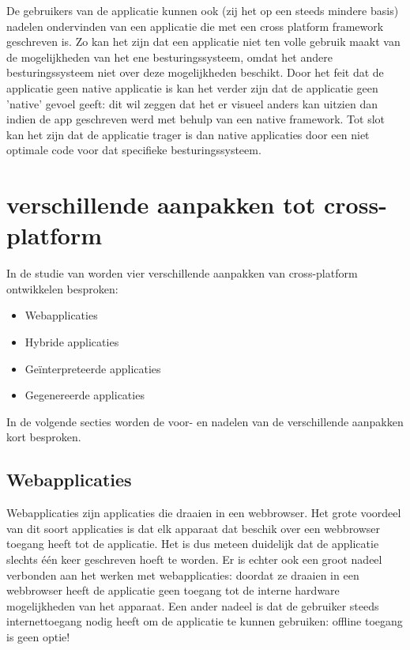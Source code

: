 De gebruikers van de applicatie kunnen ook (zij het op een steeds mindere basis) nadelen ondervinden van een applicatie die met een cross platform framework geschreven is. Zo kan het zijn dat een applicatie niet ten volle gebruik maakt van de mogelijkheden van het ene besturingssysteem, omdat het andere besturingssysteem niet over deze mogelijkheden beschikt. Door het feit dat de applicatie geen native applicatie is kan het verder zijn dat de applicatie geen 'native' gevoel geeft: dit wil zeggen dat het er visueel anders kan uitzien dan indien de app geschreven werd met behulp van een native framework. Tot slot kan het zijn dat de applicatie trager is dan native applicaties door een niet optimale code voor dat specifieke besturingssysteem.

\section{verschillende aanpakken tot cross-platform}
 
 In de studie van \textcite{Xanthopoulos2013} worden vier verschillende aanpakken van cross-platform ontwikkelen besproken:
 
 \begin{itemize}
     \item Webapplicaties
     \item Hybride applicaties
     \item Geïnterpreteerde applicaties
     \item Gegenereerde applicaties
 \end{itemize}

In de volgende secties worden de voor- en nadelen van de verschillende aanpakken kort besproken.

\subsection{Webapplicaties}

Webapplicaties zijn applicaties die draaien in een webbrowser. Het grote voordeel van dit soort applicaties is dat elk apparaat dat beschik over een webbrowser toegang heeft tot de applicatie. Het is dus meteen duidelijk dat de applicatie slechts één keer geschreven hoeft te worden. Er is echter ook een groot nadeel verbonden aan het werken met webapplicaties: doordat ze draaien in een webbrowser heeft de applicatie geen toegang tot de interne hardware mogelijkheden van het apparaat. Een ander nadeel is dat de gebruiker steeds internettoegang nodig heeft om de applicatie te kunnen gebruiken: offline toegang is geen optie!

